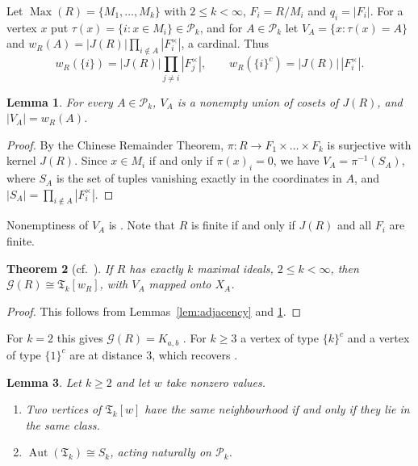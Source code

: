 \documentclass[11pt]{amsart}
\newtheorem{theorem}{Theorem}[section]
\newtheorem{lemma}[theorem]{Lemma}
\theoremstyle{definition}
\theoremstyle{remark}
\newcommand{\Max}{\operatorname{Max}}
\newcommand{\Jac}{J}
\newcommand{\G}{\mathcal{G}}
\newcommand{\TG}{\mathfrak{T}}
\newcommand{\Pk}{\mathcal{P}_k}
\newcommand{\co}[1]{{#1}^{c}}
\DeclareMathOperator{\Aut}{Aut}
\begin{document}
Let $\Max(R)=\{M_1,\dots,M_k\}$ with $2\le k<\infty$, $F_i=R/M_i$ and $q_i=|F_i|$. For a vertex $x$
put $\tau(x)=\{i:x\in M_i\}\in\Pk$, and for $A\in\Pk$ let $V_A=\{x:\tau(x)=A\}$ and
$w_R(A)=|\Jac(R)|\prod_{i\notin A}|F_i^{\times}|$, a cardinal. Thus
\begin{equation}\label{eq:sing-cosing}
  w_R(\{i\})=|\Jac(R)|\prod_{j\neq i}|F_j^\times|,\qquad w_R(\co{\{i\}})=|\Jac(R)|\,|F_i^\times| .
\end{equation}

\begin{lemma}\label{lem:realization}
For every $A\in\Pk$, $V_A$ is a nonempty union of cosets of $\Jac(R)$, and $|V_A|=w_R(A)$.
\end{lemma}

\begin{proof}
By the Chinese Remainder Theorem, $\pi\colon R\to F_1\times\dots\times F_k$ is surjective with kernel
$\Jac(R)$. Since $x\in M_i$ if and only if $\pi(x)_i=0$, we have $V_A=\pi^{-1}(S_A)$, where $S_A$ is
the set of tuples vanishing exactly in the coordinates in $A$, and $|S_A|=\prod_{i\notin A}|F_i^\times|$.
\end{proof}

Nonemptiness of $V_A$ is \cite[Proposition~2.3]{MP11}. Note that $R$ is finite if and only if
$\Jac(R)$ and all $F_i$ are finite.

\begin{theorem}[cf.\ {\cite[Theorem~2.4]{MP11}}]\label{thm:structure}
If $R$ has exactly $k$ maximal ideals, $2\le k<\infty$, then $\G(R)\cong\TG_k[w_R]$, with $V_A$
mapped onto $X_A$.
\end{theorem}

\begin{proof}
This follows from Lemmas~\ref{lem:adjacency} and \ref{lem:realization}.
\end{proof}

For $k=2$ this gives $\G(R)=K_{a,b}$ \cite[Theorem~2.2]{MSSY08}. For $k\ge3$ a vertex of type
$\co{\{k\}}$ and a vertex of type $\co{\{1\}}$ are at distance $3$, which recovers
\cite[Proposition~3.3(b)]{MR15}.

\begin{lemma}\label{lem:twins}
Let $k\ge2$ and let $w$ take nonzero values.
\begin{enumerate}[label=\textup{(\roman*)}]
\item Two vertices of $\TG_k[w]$ have the same neighbourhood if and only if they lie in the same
  class.
\item $\Aut(\TG_k)\cong S_k$, acting naturally on $\Pk$.
\end{enumerate}
\end{lemma}
\end{document}
